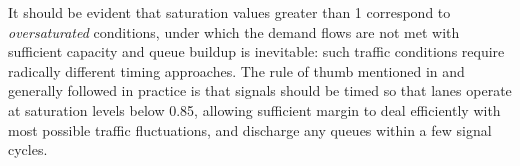 It should be evident that saturation values greater than 1 correspond to \emph{oversaturated}
conditions, under which the demand flows are not met with sufficient capacity and queue
buildup is inevitable: such traffic conditions require radically different timing approaches.
The rule of thumb mentioned in  and generally followed in practice is that
signals should be timed so that lanes operate at saturation levels below 0.85, allowing sufficient margin to deal efficiently with most possible traffic fluctuations, and discharge any queues within a few signal cycles.
